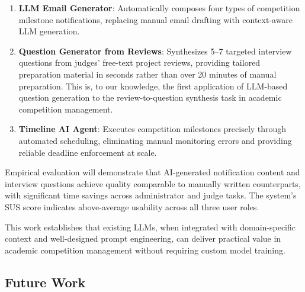 \documentclass[runningheads]{llncs}
\begin{document}
\begin{enumerate}
  \item \textbf{LLM Email Generator}: Automatically composes four types of competition milestone notifications, replacing manual email drafting with context-aware LLM generation.
  \item \textbf{Question Generator from Reviews}: Synthesizes 5--7 targeted interview questions from judges' free-text project reviews, providing tailored preparation material in seconds rather than over 20 minutes of manual preparation. This is, to our knowledge, the first application of LLM-based question generation to the review-to-question synthesis task in academic competition management.
  \item \textbf{Timeline AI Agent}: Executes competition milestones precisely through automated scheduling, eliminating manual monitoring errors and providing reliable deadline enforcement at scale.
\end{enumerate}

Empirical evaluation will demonstrate that AI-generated notification content and interview questions achieve quality comparable to manually written counterparts, with significant time savings across administrator and judge tasks. The system's SUS score indicates above-average usability across all three user roles.

This work establishes that existing LLMs, when integrated with domain-specific context and well-designed prompt engineering, can deliver practical value in academic competition management without requiring custom model training.

\subsection*{Future Work}
\end{document}
